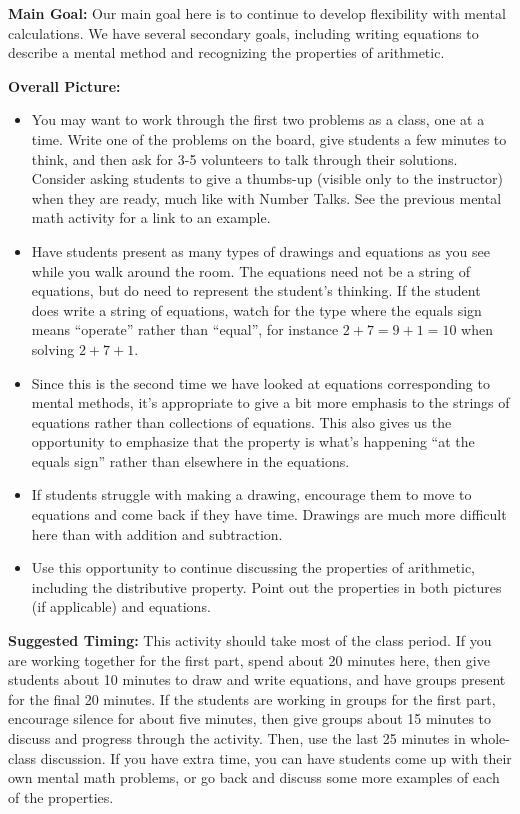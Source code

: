 \documentclass{ximera}
\begin{document}
\newpage
\begin{instructorNotes}

{\bf Main Goal:} Our main goal here is to continue to develop flexibility with mental calculations. We have several secondary goals, including writing equations to describe a mental method and recognizing the properties of arithmetic.


{\bf Overall Picture:}

\begin{itemize}
\item You may want to work through the first two problems as a class, one at a time. Write one of the problems on the board, give students a few minutes to think, and then ask for 3-5 volunteers to talk through their solutions. Consider asking students to give a thumbs-up (visible only to the instructor) when they are ready, much like with Number Talks. See the previous mental math activity for a link to an example.
\item Have students present as many types of drawings and equations as you see while you walk around the room. The equations need not be a string of equations, but do need to represent the student's thinking. If the student does write a string of equations, watch for the type where the equals sign means ``operate'' rather than ``equal'', for instance $2 + 7 = 9 + 1 = 10$ when solving $2 + 7 + 1$.
\item Since this is the second time we have looked at equations corresponding to mental methods, it's appropriate to give a bit more emphasis to the strings of equations rather than collections of equations. This also gives us the opportunity to emphasize that the property is what's happening ``at the equals sign'' rather than elsewhere in the equations.
\item If students struggle with making a drawing, encourage them to move to equations and come back if they have time. Drawings are much more difficult here than with addition and subtraction.
\item Use this opportunity to continue discussing the properties of arithmetic, including the distributive property. Point out the properties in both pictures (if applicable) and equations.

\end{itemize}






{\bf Suggested Timing:} This activity should take most of the class period. If you are working together for the first part, spend about 20 minutes here, then give students about 10 minutes to draw and write equations, and have groups present for the final 20 minutes. If the students are working in groups for the first part, encourage silence for about five minutes, then give groups about 15 minutes to discuss and progress through the activity. Then, use the last 25 minutes in whole-class discussion. If you have extra time, you can have students come up with their own mental math problems, or go back and discuss some more examples of each of the properties.

\end{instructorNotes}
\end{document}
